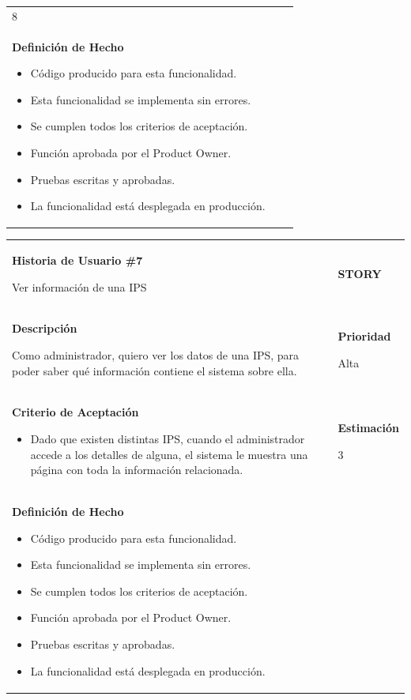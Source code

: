 \documentclass[12pt,a4paper]{article}
\begin{document}
\begin{center}
\begin{tabular}{|>{\columncolor[RGB]{215, 215, 215}} p{10cm} >{\columncolor[RGB]{215, 215, 215}} c >{\columncolor[RGB]{215, 215, 215}} p{2.5cm}|}
8 \\ 

\textbf{Definición de Hecho}

\begin{itemize}
\item Código producido para esta funcionalidad.
\item Esta funcionalidad se implementa sin errores.
\item Se cumplen todos los criterios de aceptación.
\item Función aprobada por el Product Owner.
\item Pruebas escritas y aprobadas.
\item La funcionalidad está desplegada en producción.
\end{itemize} & & \\
\hline 
\end{tabular}
\vspace{5mm}

\begin{tabular}{| p{10cm} c p{2.5cm}|}
\hline 
\textbf{Historia de Usuario \#7}

Ver información de una IPS & & \textbf{{\Large STORY}} \\ 
\textbf{Descripción}

Como administrador, quiero ver los datos de una IPS, para poder saber
qué información contiene el sistema sobre ella. &  & \textbf{Prioridad}

Alta\\

\textbf{Criterio de Aceptación}

\begin{itemize}
\item Dado que existen distintas IPS, cuando el administrador accede a
los detalles de alguna, el sistema le muestra una página con toda
la información relacionada.
\end{itemize} & & \textbf{Estimación}

3 \\ 

\textbf{Definición de Hecho}

\begin{itemize}
\item Código producido para esta funcionalidad.
\item Esta funcionalidad se implementa sin errores.
\item Se cumplen todos los criterios de aceptación.
\item Función aprobada por el Product Owner.
\item Pruebas escritas y aprobadas.
\item La funcionalidad está desplegada en producción.
\end{itemize} & & \\
\hline  
\end{tabular}
\vspace{5mm}


\end{center}
\end{document}
